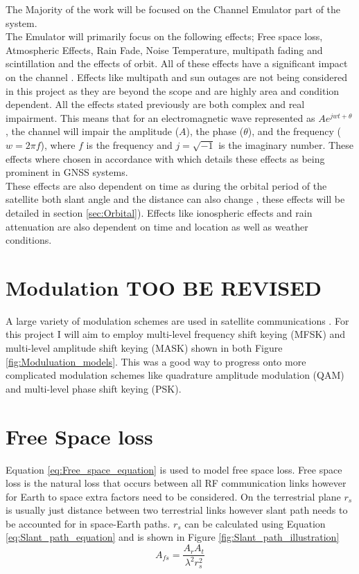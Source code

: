 \documentclass[conference]{IEEEtran}
\begin{document}
The Majority of the work will be focused on the Channel Emulator part of the system.\\

The Emulator will primarily focus on the following effects; Free space loss, Atmospheric Effects, Rain Fade, Noise Temperature, multipath fading and scintillation and the effects of orbit. All of these effects have a significant impact on the channel \cite{kaplan_understanding_2017}. Effects like multipath and sun outages are not being considered in this project as they are beyond the scope and are highly area and condition dependent. All the effects stated previously are both complex and real impairment. This means that for an electromagnetic wave represented as $Ae^{j w t+\theta}$, the channel will impair the amplitude ($A$), the phase ($\theta$), and the frequency ($w = 2\pi f$), where $f$ is the frequency and $j= \sqrt{-1}$ is the imaginary number. These effects where chosen in accordance with \cite{kaplan_understanding_2017} which details these effects as being prominent in GNSS systems.\\

These effects are also dependent on time as during the orbital period of the satellite both slant angle \cite{seybold_introduction_2005} and the distance can also change \cite{10.5555/2601574}, these effects will be detailed in section \ref{sec:Orbital}). Effects like ionospheric effects and rain attenuation are also dependent on time and location as well as weather conditions.
\label{sec:intro}


\section{Modulation TOO BE REVISED}
A large variety of modulation schemes are used in satellite communications \cite{smith_modulation_2017}. For this project I will aim to employ multi-level frequency shift keying (MFSK) and multi-level amplitude shift keying (MASK) shown in both Figure \ref{fig:Moduluation_models}. This was a good way to progress onto more complicated modulation schemes like quadrature amplitude modulation (QAM) and multi-level phase shift keying (PSK).

\label{sec:Modulation}


\section{Free Space loss}
Equation \ref{eq:Free_space_equation} is used to model free space loss. Free space loss is the natural loss that occurs between all RF communication links \cite{seybold_introduction_2005} however for Earth to space extra factors need to be considered. On the terrestrial plane $r_s$ is usually just distance between two terrestrial links however slant path needs to be accounted for in space-Earth paths. $r_s$ can be calculated using Equation \ref{eq:Slant_path_equation} and is shown in Figure \ref{fig:Slant_path_illustration}\\
\begin{equation}
A_{fs} = \frac{A_r A_t}{\lambda^2 r_s^2}
\label{eq:Free_space_equation}
\end{equation}
\end{document}
